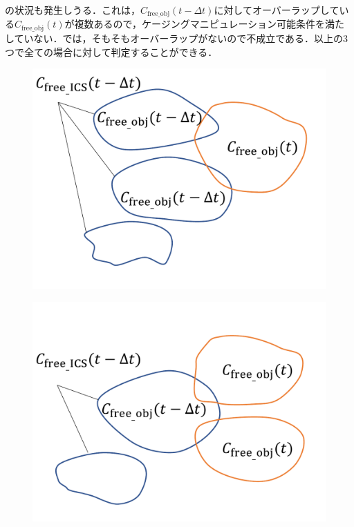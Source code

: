 \documentclass[a4paper,twoside,12pt,papersize, dvipdfmx]{iirthesis}
\begin{document}
の状況も発生しうる．これは，$C_{\mathrm{free\_obj}}(t-\Delta t)$に対してオーバーラップしている$C_{\mathrm{free\_obj}}(t)$が複数あるので，ケージングマニピュレーション可能条件を満たしていない．では，そもそもオーバーラップがないので不成立である．以上の3つで全ての場合に対して判定することができる．

\begin{figure}[b]
\begin{minipage}{0.33\hsize}
\includegraphics[width=\hsize]{fig/3-new-planner/rev_cagingmani_ver1.pdf}
\subcaption{}\label{fig::planner::cm1}
\end{minipage}\hfill
\begin{minipage}{0.33\hsize}
\includegraphics[width=\hsize]{fig/3-new-planner/rev_cagingmani_ver2.pdf}

\end{minipage}
\end{figure}
\end{document}
